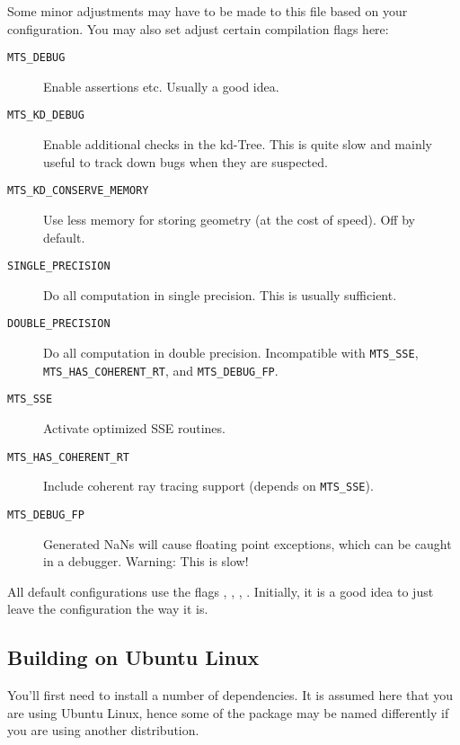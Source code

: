 Some minor adjustments may have to be made to this file based on your configuration. 
You may also set adjust certain compilation flags here:
\begin{description}
\item[\texttt{MTS\_DEBUG}] Enable assertions etc. Usually a good idea.
\item[\texttt{MTS\_KD\_DEBUG}] Enable additional checks in the kd-Tree. This
is quite slow and mainly useful to track down bugs when they are suspected.
\item[\texttt{MTS\_KD\_CONSERVE\_MEMORY}] Use less memory for storing geometry (at the cost of speed).
Off by default.
\item[\texttt{SINGLE\_PRECISION}] Do all computation in single precision. This is usually sufficient.
\item[\texttt{DOUBLE\_PRECISION}] Do all computation in double precision. Incompatible with
\texttt{MTS\_SSE}, \texttt{MTS\_HAS\_COHERENT\_RT}, and \texttt{MTS\_DEBUG\_FP}.
\item[\texttt{MTS\_SSE}]Activate optimized SSE routines.
\item[\texttt{MTS\_HAS\_COHERENT\_RT}]Include coherent ray tracing support (depends on \texttt{MTS\_SSE}).
\item[\texttt{MTS\_DEBUG\_FP}]Generated NaNs will cause floating point exceptions, which can be caught in a debugger. Warning: This is slow!
\end{description}
All default configurations use the flags , , , .
Initially, it is a good idea to just leave the configuration the way it is.

\subsection{Building on Ubuntu Linux}
You'll first need to install a number of dependencies. It is assumed here
that you are using Ubuntu Linux, hence some of the package may be named differently if you are 
using another distribution.

